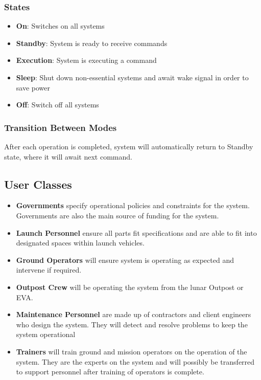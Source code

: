 \documentclass[12pt, letter]{article}
\begin{document}
\subsubsection{States}
\label{states}
\begin{itemize}[label={},leftmargin=0em]
\item{\textbf{On}: Switches on all systems}
\item{\textbf{Standby}: System is ready to receive commands}
\item{\textbf{Execution}: System is executing a command}
\item{\textbf{Sleep}: Shut down non-essential systems and await wake signal in order to save power}
\item{\textbf{Off}: Switch off all systems}
\end{itemize}
\subsubsection{Transition Between Modes}
After each operation is completed, system will automatically return to Standby state, where it will await next command.
\subsection{User Classes}
\label{users}
\begin{itemize}[label={},leftmargin=0em]
\item{\textbf{Governments} specify operational policies and constraints for the system. Governments are also the main source of funding for the system.}
\item{\textbf{Launch Personnel} ensure all parts fit specifications and are able to fit into designated spaces within launch vehicles.}
\item{\textbf{Ground Operators} will ensure system is operating as expected and intervene if required.}
\item{\textbf{Outpost Crew} will be operating the system from the lunar Outpost or EVA.}
\item{\textbf{Maintenance Personnel} are made up of contractors and client engineers who design the system. They will detect and resolve problems to keep the system operational}
\item{\textbf{Trainers} will train ground and mission operators on the operation of the system. They are the experts on the system and will possibly be transferred to support personnel after training of operators is complete.}
\end{itemize}
\end{document}

